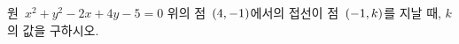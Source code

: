 원~$x^2+y^2-2x+4y-5=0$ 위의 점~$(4{,}\mkern3mu\mathopen{}-1)$에서의 접선이 점~$(-1{,}\mkern3mu\mathopen{}k)$를 지날 때, $k$의 값을 구하시오.
